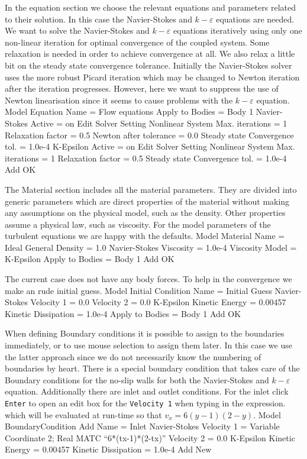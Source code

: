In the equation section we choose the relevant equations and 
parameters related to their solution. 
In this case the Navier-Stokes and $k-\varepsilon$ equations are needed.
We want to solve the Navier-Stokes and $k-\varepsilon$ equations iteratively using only one non-linear iteration
for optimal convergence of the coupled system. Some relaxation is needed in order to achieve convergence 
at all. We also relax a little bit on the steady state convergence tolerance. 
Initially the Navier-Stokes
solver uses the more robust Picard iteration which may be changed to Newton iteration after the iteration 
progresses. However, here we want to suppress the use of Newton linearisation since it seems to
cause problems with the $k-\varepsilon$ equation.
\ttbegin
Model
  Equation
    Name = Flow equations
    Apply to Bodies = Body 1
    Navier-Stokes 
      Active = on
      Edit Solver Setting
        Nonlinear System
          Max. iterations = 1
          Relaxation factor = 0.5
          Newton after tolerance = 0.0
        Steady state
          Convergence tol. = 1.0e-4
    K-Epsilon 
      Active = on
      Edit Solver Setting
        Nonlinear System
          Max. iterations = 1
          Relaxation factor = 0.5
        Steady state
          Convergence tol. = 1.0e-4
    Add 
    OK
\ttend        

The Material section includes all the material parameters.
They are divided into generic parameters which are direct properties of the material
without making any assumptions on the physical model, such as the density. Other properties assume
a physical law, such as viscosity. For the model parameters of the turbulent equations we are 
happy with the defaults. 
\ttbegin
Model
  Material
    Name = Ideal
    General 
      Density = 1.0
    Navier-Stokes 
      Viscosity = 1.0e-4
      Viscosity Model = K-Epsilon
    Apply to Bodies = Body 1 
    Add
    OK
\ttend

The current case does not have any body forces. To help in the convergence we make 
an rude initial guess.
\ttbegin
Model
  Initial Condition 
    Name = Initial Guess
    Navier-Stokes
      Velocity 1 = 0.0
      Velocity 2 = 0.0
    K-Epsilon
      Kinetic Energy = 0.00457
      Kinetic Dissipation = 1.0e-4
    Apply to Bodies = Body 1 
    Add
    OK
\ttend

When defining Boundary conditions it is possible to assign to the boundaries immediately, or to use mouse
selection to assign them later. In this case we use the latter approach since we do not necessarily know 
the numbering of boundaries by heart.
There is a special boundary condition that takes care of the 
Boundary conditions for the no-slip walls for both the Navier-Stokes and
$k-\varepsilon$ equation. Additionally there are inlet and outlet conditions. 
For the inlet click \texttt{Enter} to open an edit box for the \texttt{Velocity 1} when typing in the expression.
which will be evaluated at run-time so that $v_x=6(y-1)(2-y)$. 
\ttbegin
Model
  BoundaryCondition
    Add 
    Name = Inlet
    Navier-Stokes 
      Velocity 1 = Variable Coordinate 2; Real MATC  ``6*(tx-1)*(2-tx)''
      Velocity 2 = 0.0
    K-Epsilon
      Kinetic Energy = 0.00457
      Kinetic Dissipation = 1.0e-4
    Add
    New

